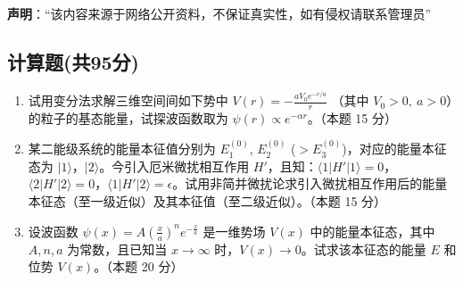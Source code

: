 
\textbf{声明}：“该内容来源于网络公开资料，不保证真实性，如有侵权请联系管理员”

\subsection{计算题(共95分)}
\begin{enumerate}
\item 试用变分法求解三维空间间如下势中 $V(r) = -\frac{aV_0 e^{-r/a}}{r}$ （其中 $V_0 > 0, \ a > 0$）的粒子的基态能量，试探波函数取为 $\psi(r) \propto e^{-\alpha r}$。（本题 15 分）
\item 某二能级系统的能量本征值分别为 $E_1^{(0)}$, $E_2^{(0)}$ ($ > E_3^{(0)}$)，对应的能量本征态为 $|1\rangle$，$|2\rangle$。今引入厄米微扰相互作用 $H'$，且知：$\langle 1|H'|1\rangle = 0$，$\langle 2|H'|2\rangle = 0$，$\langle 1|H'|2\rangle = \epsilon$。试用非简并微扰论求引入微扰相互作用后的能量本征态（至一级近似）及其本征值（至二级近似）。（本题 15 分）
\item 设波函数 $\psi(x) = A \left(\frac{x}{a}\right)^n e^{-\frac{x}{a}}$ 是一维势场 $V(x)$ 中的能量本征态，其中 $A, n, a$ 为常数，且已知当 $x \to \infty$ 时，$V(x) \to 0$。试求该本征态的能量 $E$ 和位势 $V(x)$。（本题 20 分）
\end{enumerate}
